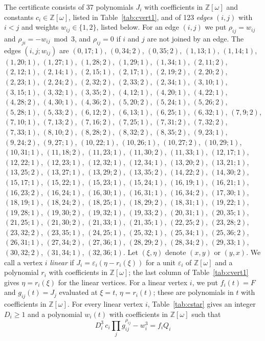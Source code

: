 \documentclass[11pt]{article}
\newcommand{\Z}{\mathbb{Z}}
\begin{document}
The certificate consists of 37 polynomials $J_i$ with coefficients in $\Z[\omega]$ and constants $c_i\in\Z[\omega]$, listed in Table~\ref{tab:cvert1}, and of 123 \emph{edges} $(i,j)$ with $i<j$ and weights $w_{ij}\in\{1,2\}$, listed below. For an edge $(i,j)$ we put $\rho_{ij}=w_{ij}$ and $\rho_{ji}=-w_{ij}\bmod 3$, and $\rho_{ij}=0$ if $i$ and $j$ are not joined by an edge.
The edges $(i,j;w_{ij})$ are $(0,17;1)$, $(0,34;2)$, $(0,35;2)$, $(1,13;1)$, $(1,14;1)$, $(1,20;1)$, $(1,27;1)$, $(1,28;2)$, $(1,29;1)$, $(1,34;1)$, $(2,11;2)$, $(2,12;1)$, $(2,14;1)$, $(2,15;1)$, $(2,17;1)$, $(2,19;2)$, $(2,20;2)$, $(2,23;1)$, $(2,24;2)$, $(2,32;2)$, $(2,33;2)$, $(2,34;1)$, $(3,10;1)$, $(3,15;1)$, $(3,32;1)$, $(3,35;2)$, $(4,12;1)$, $(4,20;1)$, $(4,22;1)$, $(4,28;2)$, $(4,30;1)$, $(4,36;2)$, $(5,20;2)$, $(5,24;1)$, $(5,26;2)$, $(5,28;1)$, $(5,33;2)$, $(6,12;2)$, $(6,13;1)$, $(6,25;1)$, $(6,32;1)$, $(7,9;2)$, $(7,10;1)$, $(7,13;2)$, $(7,16;2)$, $(7,25;1)$, $(7,31;2)$, $(7,32;2)$, $(7,33;1)$, $(8,10;2)$, $(8,28;2)$, $(8,32;2)$, $(8,35;2)$, $(9,23;1)$, $(9,24;2)$, $(9,27;1)$, $(10,22;1)$, $(10,26;1)$, $(10,27;2)$, $(10,29;1)$, $(10,31;1)$, $(11,18;2)$, $(11,23;1)$, $(11,30;2)$, $(11,33;1)$, $(12,17;1)$, $(12,22;1)$, $(12,23;1)$, $(12,32;1)$, $(12,34;1)$, $(13,20;2)$, $(13,21;1)$, $(13,25;2)$, $(13,27;1)$, $(13,29;2)$, $(13,35;2)$, $(14,22;2)$, $(14,30;2)$, $(15,17;1)$, $(15,22;1)$, $(15,23;1)$, $(15,24;1)$, $(16,19;1)$, $(16,21;1)$, $(16,23;2)$, $(16,24;1)$, $(16,30;1)$, $(16,31;1)$, $(16,34;2)$, $(17,30;1)$, $(18,19;1)$, $(18,24;2)$, $(18,25;1)$, $(18,29;2)$, $(18,31;1)$, $(19,22;1)$, $(19,28;1)$, $(19,30;2)$, $(19,32;1)$, $(19,33;2)$, $(20,31;1)$, $(20,35;1)$, $(21,25;1)$, $(21,30;2)$, $(21,33;1)$, $(21,35;1)$, $(22,25;2)$, $(23,28;2)$, $(23,32;2)$, $(23,35;1)$, $(24,25;1)$, $(25,32;1)$, $(25,34;1)$, $(25,36;2)$, $(26,31;1)$, $(27,34;2)$, $(27,36;1)$, $(28,29;2)$, $(28,34;2)$, $(29,33;1)$, $(30,32;2)$, $(31,34;1)$, $(32,36;1)$.
Let $(\xi,\eta)$ denote $(x,y)$ or $(y,x)$. We call a vertex $i$ \emph{linear} if $J_i=\varepsilon_i(\eta-r_i(\xi))$ for a unit $\varepsilon_i$ of $\Z[\omega]$ and a polynomial $r_i$ with coefficients in $\Z[\omega]$; the last column of Table~\ref{tab:cvert1} gives $\eta=r_i(\xi)$ for the linear vertices. For a linear vertex $i$, we put $f_i(t)=F$ and $g_{ij}(t)=J_j$ evaluated at $\xi=t$, $\eta=r_i(t)$; these are polynomials in $t$ with coefficients in $\Z[\omega]$.
For every linear vertex $i$, Table~\ref{tab:cstar} gives an integer $D_i\geq1$ and a polynomial $w_i(t)$ with coefficients in $\Z[\omega]$ such that
\begin{equation}\label{eq:cstarlin}
D_i^3\,c_i\prod_jg_{ij}^{\rho_{ij}}-w_i^3=f_iQ_i
\end{equation}
\end{document}
